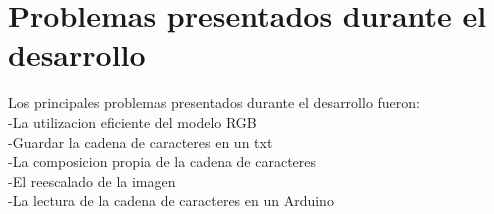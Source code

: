 \documentclass{article}
\begin{document}
\section{Problemas presentados durante el desarrollo}\label{}
Los principales problemas presentados durante el desarrollo fueron:\\
-La utilizacion eficiente del modelo RGB\\
-Guardar la cadena de caracteres en un txt\\
-La composicion propia de la cadena de caracteres\\
-El reescalado de la imagen\\
-La lectura de la cadena de caracteres en un Arduino
\end{document}
